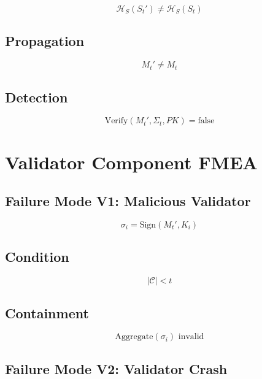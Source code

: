 \begin{equation}
\mathcal{H}_S(S_t') \neq \mathcal{H}_S(S_t)
\end{equation}

\subsection{Propagation}

\begin{equation}
M_t' \neq M_t
\end{equation}

\subsection{Detection}

\begin{equation}
\text{Verify}(M_t', \Sigma_t, PK) = \text{false}
\end{equation}

\section{Validator Component FMEA}

\subsection{Failure Mode V1: Malicious Validator}

\begin{equation}
\sigma_i = \text{Sign}(M_t', K_i)
\end{equation}

\subsection{Condition}

\begin{equation}
|\mathcal{C}| < t
\end{equation}

\subsection{Containment}

\begin{equation}
\text{Aggregate}(\sigma_i) \text{ invalid}
\end{equation}

\subsection{Failure Mode V2: Validator Crash}

